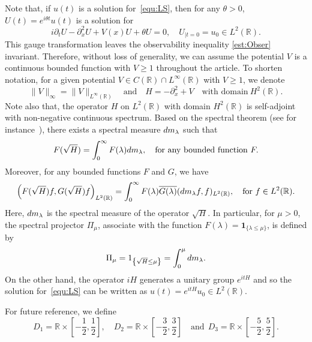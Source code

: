 \documentclass[a4paper,reqno]{amsart}
\theoremstyle{definition}
\numberwithin{equation}{section}
\newcommand{\R}{\mathbb{R}}
\def \R {{\mathbb{R} }}
\def \d {{\rm{d}}}
\def \pt{\partial_{t}}
\begin{document}
\smallskip
Note that, if $u(t)$ is a solution for~\eqref{equ:LS},
then for any $\theta>0$, $U(t)=e^{i\theta t}u(t)$ is a solution for
\begin{equation*}
i\pt U-\partial_{x}^{2}U+V(x)U+\theta U=0,\quad U_{|t=0}=u_{0}\in L^{2}(\R).
\end{equation*}
This gauge transformation leaves the observability inequality \eqref{est:Obser} invariant.
Therefore, without loss of generality, we can assume the potential $V$ is a continuous bounded function with $V\ge 1$ throughout the article. To shorten notation, for a given potential $V\in C(\R)\cap L^{\infty}(\R)$ with $V\ge 1$, we denote
\begin{equation*}
\|V\|_{\infty}=\|V\|_{L^{\infty}(\R)}\quad \mbox{and}\quad {H}=-\partial_{x}^{2}+V\quad \mbox{with domain}\ H^{2}(\R).
\end{equation*}
Note also that, the operator ${H}$ on $L^{2}(\R)$ with domain $H^{2}(\R)$ is self-adjoint with non-negative continuous spectrum. Based on the spectral theorem (see for instance~\cite[Section 2.5]{DAVIES}), there exists a spectral measure $\d m_{\lambda}$ such that 
\begin{equation*}
F(\sqrt{{H}})=\int_{0}^{\infty}F(\lambda)\d m_{\lambda},\quad \mbox{for any bounded function} \ F.
\end{equation*}
Moreover, for any bounded functions $F$ and $G$, we have 
\begin{equation*}
\left(F(\sqrt{{H}})f,G(\sqrt{{H}})f\right)_{L^{2}(\R)}=\int_{0}^{\infty}F(\lambda)\overline{G(\lambda)}(\d m_{\lambda}f,f)_{L^{2}(\R)},\quad \mbox{for}\ f\in L^{2}(\R).
\end{equation*}
Here, $\d m_{\lambda}$ is the spectral measure of the operator $\sqrt{{H}}$.
In particular, for $\mu>0$, the spectral projector $\Pi_{\mu}$, associate with the function $F(\lambda)=\textbf{1}_{\{\lambda\le \mu\}}$, is defined by 
\begin{equation*}
\Pi_{\mu}=\textbf{1}_{\left\{\sqrt{{H}}\le \mu\right\}}=\int_{0}^{\mu}\d m_{\lambda}.
\end{equation*} 
On the other hand, the operator $i{H}$ generates a unitary group $e^{it{H}}$ and so the solution for~\eqref{equ:LS} can be written as $u(t)=e^{it{H}}u_{0}\in L^{2}(\R)$. 

\smallskip
For future reference, we define
\begin{equation*}
D_{1}=\R\times \left[-\frac{1}{2},\frac{1}{2}\right],\quad 
D_{2}=\R\times \left[-\frac{3}{2},\frac{3}{2}\right]
\quad \mbox{and}\ \ D_{3}=\R\times \left[-\frac{5}{2},\frac{5}{2}\right].
\end{equation*}
\end{document}
